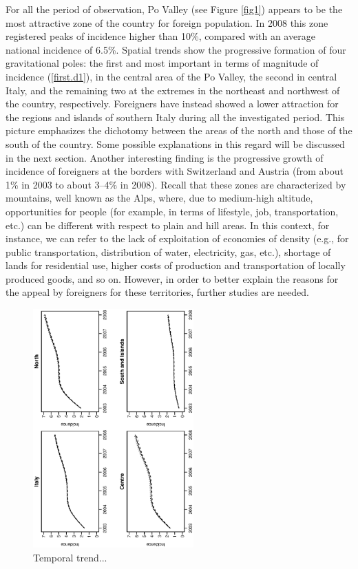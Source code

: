 \documentclass[10pt]{article}
\theoremstyle{definition}
\theoremstyle{plain}
\begin{document}
For all the period of observation, Po Valley (see Figure \ref{fig1}) appears to be the most attractive zone of the country for foreign population. In 2008 this zone registered peaks of incidence higher than 10\%, compared with an average national incidence of 6.5\%. Spatial trends show the progressive formation of four gravitational poles: the first and most important in terms of magnitude of incidence (\ref{first.d1}), in the central area of the Po Valley, the second in central Italy, and the remaining two at the extremes in the northeast and northwest of the country, respectively. Foreigners have instead showed a lower attraction for the regions and islands of southern Italy during all the investigated period. This picture emphasizes the dichotomy between the areas of the north and those of the south of the country. Some possible explanations in this regard will be discussed in the next section.
Another interesting finding is the progressive growth of incidence of foreigners at the borders with Switzerland and Austria (from about 1\% in 2003 to about 3--4\% in 2008). Recall that these zones are characterized by mountains, well known as the Alps, where, due to medium-high altitude, opportunities for people (for example, in terms of lifestyle, job, transportation, etc.) can be different with respect to plain and hill areas. In this context, for instance, we can refer to the lack of exploitation of economies of density (e.g., for public transportation, distribution of water, electricity, gas, etc.), shortage of lands for residential use, higher costs of production and transportation of locally produced goods, and so on. However, in order to better explain the reasons for the appeal by foreigners for these territories, further studies are needed.


\begin{figure}[htbp]
	\centering
		\includegraphics[width=0.55\textwidth, angle=270]{trends.ps}
	\caption{Temporal trend...}
	\label{trends}
\end{figure}
\end{document}
